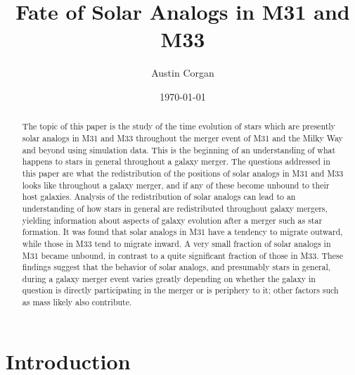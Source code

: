 \documentclass{aastex63}
\begin{document}
\title{Fate of Solar Analogs in M31 and M33}

\author{Austin Corgan}
\date{\today}

\begin{abstract}
    The topic of this paper is the study of the time evolution of stars which are presently solar analogs in M31 and M33 throughout the merger event of M31 and the Milky Way and beyond using simulation data. This is the beginning of an understanding of what happens to stars in general throughout a galaxy merger. The questions addressed in this paper are what the redistribution of the positions of solar analogs in M31 and M33 looks like throughout a galaxy merger, and if any of these become unbound to their host galaxies. Analysis of the redistribution of solar analogs can lead to an understanding of how stars in general are redistributed throughout galaxy mergers, yielding information about aspects of galaxy evolution after a merger such as star formation. It was found that solar analogs in M31 have a tendency to migrate outward, while those in M33 tend to migrate inward. A very small fraction of solar analogs in M31 became unbound, in contrast to a quite significant fraction of those in M33. These findings suggest that the behavior of solar analogs, and presumably stars in general, during a galaxy merger event varies greatly depending on whether the galaxy in question is directly participating in the merger or is periphery to it; other factors such as mass likely also contribute. 
\end{abstract}


\section{Introduction}
\end{document}
